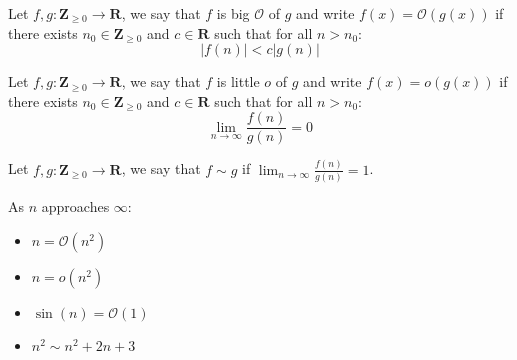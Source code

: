 \begin{definition}[Big O] 
Let $f,g:\mathbf{Z}_{\geq 0}\to \mathbf{R}$, we say that $f$ is big $\mathcal{O}$ of $g$ and write $f(x)=\mathcal{O}(g(x))$ if there exists $n_{0}\in \mathbf{Z}_{\geq0}$ and $c\in \mathbf{R}$ such that for all $n>n_{0}$:
$$
|f(n)|<c|g(n)|
$$
\end{definition}
\begin{definition}[Little o]
Let $f,g:\mathbf{Z}_{\geq 0}\to \mathbf{R}$, we say that $f$ is little $o$ of $g$ and write $f(x)=o(g(x))$ if there exists $n_{0}\in \mathbf{Z}_{\geq0}$ and $c\in \mathbf{R}$ such that for all $n>n_{0}$:
$$
\lim_{ n \to \infty } \frac{f(n)}{g(n)}=0
$$
\end{definition}
\begin{notation}
Let $f,g:\mathbf{Z}_{\ge 0}\to \mathbf{R}$, we say that $f\sim g$ if $\lim_{ n \to \infty } \frac{f(n)}{g(n)}=1$.
\end{notation}
\begin{example}
As $n$ approaches $\infty$:
\begin{itemize}
\item $n=\mathcal{O}(n^{2})$
\item $n=o(n^{2})$
\item $\sin(n)=\mathcal{O}(1)$
\item $n^{2}\sim n^{2}+2n+3$
\end{itemize}
\end{example}

